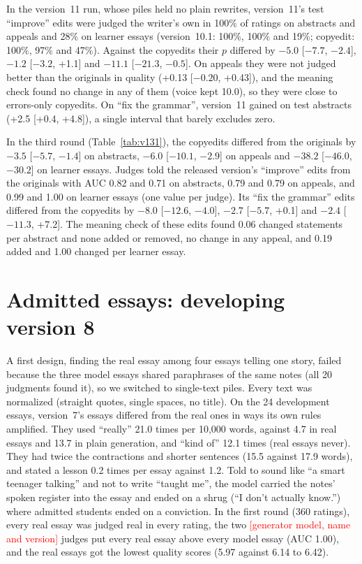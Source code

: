 \documentclass[11pt]{article}
\newcommand{\TBD}[1]{\textcolor{red}{[#1]}}
\newcommand{\genmodel}{\TBD{generator model, name and version}}
\begin{document}
In the version~11 run, whose piles held no plain rewrites, version~11's test ``improve'' edits were judged the writer's own in 100\% of ratings on abstracts and appeals and 28\% on learner essays (version~10.1: 100\%, 100\% and 19\%; copyedit: 100\%, 97\% and 47\%). Against the copyedits their $p$ differed by $-5.0$ [$-7.7$, $-2.4$], $-1.2$ [$-3.2$, +1.1] and $-11.1$ [$-21.3$, $-0.5$]. On appeals they were not judged better than the originals in quality (+0.13 [$-0.20$, +0.43]), and the meaning check found no change in any of them (voice kept 10.0), so they were close to errors-only copyedits. On ``fix the grammar'', version~11 gained on test abstracts (+2.5 [+0.4, +4.8]), a single interval that barely excludes zero.

In the third round (Table~\ref{tab:v131}), the copyedits differed from the originals by $-3.5$ [$-5.7$, $-1.4$] on abstracts, $-6.0$ [$-10.1$, $-2.9$] on appeals and $-38.2$ [$-46.0$, $-30.2$] on learner essays. Judges told the released version's ``improve'' edits from the originals with AUC 0.82 and 0.71 on abstracts, 0.79 and 0.79 on appeals, and 0.99 and 1.00 on learner essays (one value per judge). Its ``fix the grammar'' edits differed from the copyedits by $-8.0$ [$-12.6$, $-4.0$], $-2.7$ [$-5.7$, +0.1] and $-2.4$ [$-11.3$, +7.2]. The meaning check of these edits found 0.06 changed statements per abstract and none added or removed, no change in any appeal, and 0.19 added and 1.00 changed per learner essay.

\FloatBarrier
\section{Admitted essays: developing version 8}
\label{sec:appendix-essays}

A first design, finding the real essay among four essays telling one story, failed because the three model essays shared paraphrases of the same notes (all 20 judgments found it), so we switched to single-text piles. Every text was normalized (straight quotes, single spaces, no title). On the 24 development essays, version~7's essays differed from the real ones in ways its own rules amplified. They used ``really'' 21.0 times per 10,000 words, against 4.7 in real essays and 13.7 in plain generation, and ``kind of'' 12.1 times (real essays never). They had twice the contractions and shorter sentences (15.5 against 17.9 words), and stated a lesson 0.2 times per essay against 1.2. Told to sound like ``a smart teenager talking'' and not to write ``taught me'', the model carried the notes' spoken register into the essay and ended on a shrug (``I don't actually know.'') where admitted students ended on a conviction. In the first round (360 ratings), every real essay was judged real in every rating, the two \genmodel{} judges put every real essay above every model essay (AUC 1.00), and the real essays got the lowest quality scores (5.97 against 6.14 to 6.42).
\end{document}
